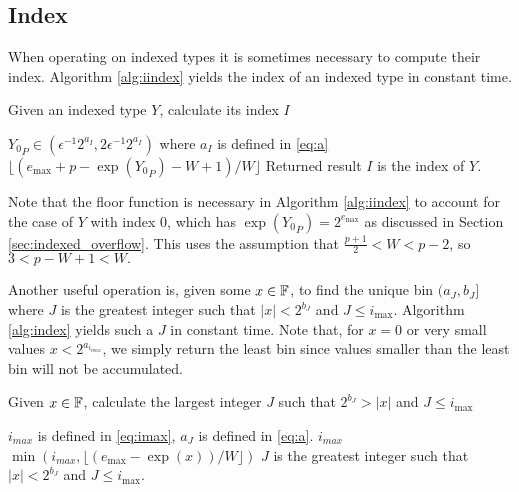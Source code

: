   \subsection{Index}
    \label{sec:primitiveops_index}
    When operating on indexed types it is sometimes necessary to compute their
    index. Algorithm \ref{alg:iindex} yields the index of an indexed type in
    constant time.

    \begin{samepage}
    \begin{alg}
      Given an indexed type $Y$, calculate its index $I$
      \begin{algorithmic}[1]
        \Require
          \Statex ${Y_0}_P \in (\epsilon^{-1}  2^{a_{I}}, 2  \epsilon^{-1}  2^{a_I})$
          where $a_I$ is defined in \eqref{eq:a}
          \State \Return $\lfloor(e_{\max} + p - \exp({Y_0}_P) - W + 1)/W\rfloor$
        \EndFunction
        \Ensure
          \Statex Returned result $I$ is the index of $Y$.
      \end{algorithmic}
      \label{alg:iindex}
    \end{alg}
    \end{samepage}

    Note that the floor function is necessary in Algorithm \ref{alg:iindex} to
    account for the case of $Y$ with index $0$, which has $\exp({Y_0}_P) =
    2^{e_{\max}}$ as discussed in Section \ref{sec:indexed_overflow}.  This
    uses the assumption that $\frac{p+1}{2} < W < p-2$, so $3 < p - W + 1 < W.$

    Another useful operation is, given some $x \in \mathbb{F}$, to find the unique bin
    $(a_J, b_J]$ where $J$ is the greatest integer such that $|x| < 2^{b_J}$ and $J \leq i_{\max}$.
    Algorithm \ref{alg:index} yields such a $J$ in constant time.
    Note that, for $x=0$ or very small values $x < 2^{a_{i_{max}}}$,
    we simply return the least bin
    since values smaller than the least bin will not be accumulated.

    \begin{samepage}
    \begin{alg}
      Given $x \in \mathbb{F}$, calculate the largest integer $J$ such that $2^{b_J} > |x|$ and $J \leq i_{\max}$
      \begin{algorithmic}[1]
        \Require $i_{max}$ is defined in \eqref{eq:imax},
          $a_J$ is defined in \eqref{eq:a}.
           \State \Return $i_{max}$ \EndIf
          \State \Return $\min(i_{max}, \lfloor(e_{\max} - \exp(x))/W\rfloor)$
        \EndFunction
        \Ensure
          \Statex $J$ is the greatest integer such that $|x| < 2^{b_J}$ and $J \leq i_{\max}$.
      \end{algorithmic}
      \label{alg:index}
    \end{alg}
     \end{samepage}
